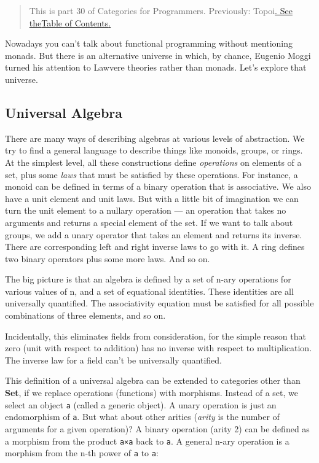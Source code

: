 \begin{quote}
This is part 30 of Categories for Programmers. Previously:
{Topoi}\href{https://bartoszmilewski.com/2017/07/22/topoi/}{. See
the}\href{https://bartoszmilewski.com/2014/10/28/category-theory-for-programmers-the-preface/}{Table
of Contents}\href{https://bartoszmilewski.com/2017/07/22/topoi/}{.}
\end{quote}

Nowadays you can't talk about functional programming without mentioning
monads. But there is an alternative universe in which, by chance,
Eugenio Moggi turned his attention to Lawvere theories rather than
monads. Let's explore that universe.

\subsection{Universal Algebra}\label{universal-algebra}

There are many ways of describing algebras at various levels of
abstraction. We try to find a general language to describe things like
monoids, groups, or rings. At the simplest level, all these
constructions define \emph{operations} on elements of a set, plus some
\emph{laws} that must be satisfied by these operations. For instance, a
monoid can be defined in terms of a binary operation that is
associative. We also have a unit element and unit laws. But with a
little bit of imagination we can turn the unit element to a nullary
operation --- an operation that takes no arguments and returns a special
element of the set. If we want to talk about groups, we add a unary
operator that takes an element and returns its inverse. There are
corresponding left and right inverse laws to go with it. A ring defines
two binary operators plus some more laws. And so on.

The big picture is that an algebra is defined by a set of n-ary
operations for various values of n, and a set of equational identities.
These identities are all universally quantified. The associativity
equation must be satisfied for all possible combinations of three
elements, and so on.

Incidentally, this eliminates fields from consideration, for the simple
reason that zero (unit with respect to addition) has no inverse with
respect to multiplication. The inverse law for a field can't be
universally quantified.

This definition of a universal algebra can be extended to categories
other than \textbf{Set}, if we replace operations (functions) with
morphisms. Instead of a set, we select an object \texttt{a} (called a
generic object). A unary operation is just an endomorphism of
\texttt{a}. But what about other arities (\emph{arity} is the number of
arguments for a given operation)? A binary operation (arity 2) can be
defined as a morphism from the product \texttt{a×a} back to \texttt{a}.
A general n-ary operation is a morphism from the n-th power of
\texttt{a} to \texttt{a}:

